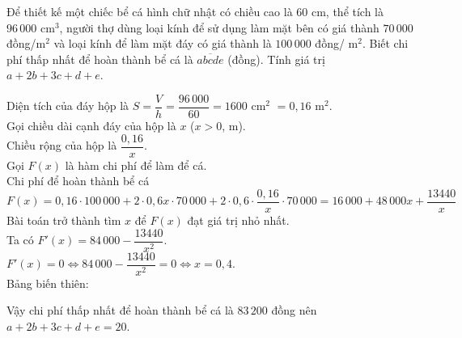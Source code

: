 \begin{bt}%
Để thiết kế một chiếc bể cá hình chữ nhật có chiều cao là $60$ cm, thể tích là $96\,000$ cm$^{3}$, người thợ dùng loại kính để sử dụng làm mặt bên có giá thành $70\,000$ đồng/m$^{2}$ và loại kính để làm mặt đáy có giá thành là $100\,000$ đồng/ m$^{2}$. Biết chi phí thấp nhất để hoàn thành bể cá là $\overline{abcde}$ (đồng). Tính giá trị $a+2b+3c+d+e$.
	\loigiai
	{
Diện tích của đáy hộp là $S=\dfrac{V}{h}=\dfrac{96\,000}{60}=1600$ cm$^2$ $=0{,}16$ m$^2$.\\
Gọi chiều dài cạnh đáy của hộp là $x$ ($x>0$, m).\\
Chiều rộng của hộp là $\dfrac{0{,}16}{x}$.\\
Gọi $F(x)$ là hàm chi phí để làm để cá.\\
Chi phí để hoàn thành bể cá
$$F(x)=0{,}16 \cdot 100\,000+2\cdot0{,}6x \cdot 70\,000+2 \cdot 0{,}6 \cdot \dfrac{0{,}16}{x} \cdot 70\,000=16\,000+48\,000 x+\dfrac{13440}{x}$$
Bài toán trở thành tìm $x$ để $F(x)$ đạt giá trị nhỏ nhất.\\
Ta có $F'(x)=84\,000-\dfrac{13440}{x^{2}}$.\\
$F'(x)=0 \Leftrightarrow 84\,000-\dfrac{13440}{x^{2}}=0 \Leftrightarrow x=0{,}4$.\\
Bảng biến thiên:
\begin{center}

\end{center}

Vậy chi phí thấp nhất để hoàn thành bể cá là $83\,200$ đồng nên $a+2b+3c+d+e=20$.
	}
\end{bt}

